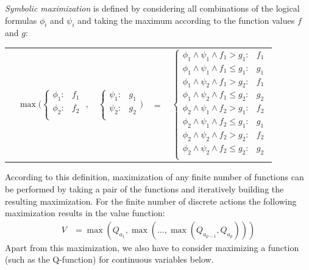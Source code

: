 \documentclass[letterpaper]{article}
\begin{document}
\emph{Symbolic maximization} is defined by considering all combinations of the logical formulas $\phi_i$ and $\psi_i$ and taking the maximum according to the function values $f$ and $g$:
\vspace{-5mm}

{\footnotesize
\begin{center}
\begin{tabular}{r c c c l}
&
\hspace{-9mm} $\max \Bigg(
  \begin{cases}
    \phi_1: & f_1 \\ 
    \phi_2: & f_2 \\ 
  \end{cases}$
$,$
&
\hspace{-4mm}
  $\begin{cases}
    \psi_1: & g_1 \\ 
    \psi_2: & g_2 \\ 
  \end{cases} \Bigg)$
&
\hspace{-4mm} 
$ = $
&
\hspace{-4mm}
  $\begin{cases}
  \phi_1 \wedge \psi_1 \wedge f_1 > g_1    : & f_1 \\ 
  \phi_1 \wedge \psi_1 \wedge f_1 \leq g_1 : & g_1 \\ 
  \phi_1 \wedge \psi_2 \wedge f_1 > g_2    : & f_1 \\ 
  \phi_1 \wedge \psi_2 \wedge f_1 \leq g_2 : & g_2 \\ 
  \phi_2 \wedge \psi_1 \wedge f_2 > g_1    : & f_2 \\ 
  \phi_2 \wedge \psi_1 \wedge f_2 \leq g_1 : & g_1 \\ 
  \phi_2 \wedge \psi_2 \wedge f_2 > g_2    : & f_2 \\ 
  \phi_2 \wedge \psi_2 \wedge f_2 \leq g_2 : & g_2 \\ 
  \end{cases}$
\end{tabular}
\end{center}
}

According to this definition, maximization of any finite number of functions can be performed by taking a pair of the functions and iteratively building the resulting maximization. For the finite number of discrete actions the following maximization results in the value function: 
\begin{align}
V & 
= \max(Q_{a_1},\max(\ldots, \max (Q_{a_{p-1}},Q_{a_p})))
\end{align}
Apart from this maximization, we also have to consider maximizing a function (such as the Q-function) for continuous variables below.
\end{document}
